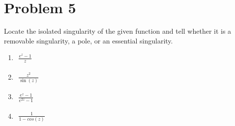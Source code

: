 \documentclass[11pt]{article}
\begin{document}
\newpage
\section{Problem 5}
Locate the isolated singularity of the given function and tell whether it is a removable singularity, a pole, or an essential singularity.
\begin{enumerate}[label=\textbf{(\alph*)}]
    \item
          \begin{flushleft}
              $\begin{aligned}
                      \frac{e^{z}-1}{z}
                  \end{aligned}$
          \end{flushleft}
    \item
          \begin{flushleft}
              $\begin{aligned}
                      \frac{z^{2}}{\sin(z)}
                  \end{aligned}$
          \end{flushleft}
    \item
          \begin{flushleft}
              $\begin{aligned}
                      \frac{e^{z}-1}{e^{2z}-1}
                  \end{aligned}$
          \end{flushleft}
    \item
          \begin{flushleft}
              $\begin{aligned}
                      \frac{1}{1-cos(z)}
                  \end{aligned}$
          \end{flushleft}
\end{enumerate}
\end{document}
